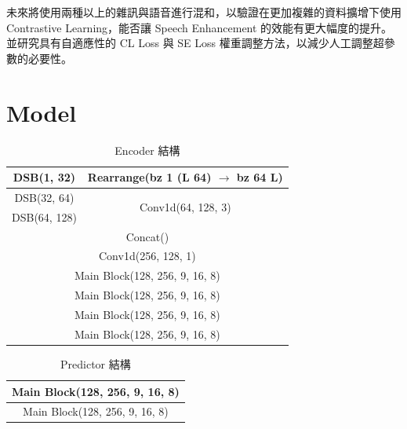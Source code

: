 \documentclass[10pt,twocolumn,letterpaper]{article}
\begin{document}
\begin{CJK}{UTF8}{bkai}
   未來將使用兩種以上的雜訊與語音進行混和，以驗證在更加複雜的資料擴增下使用 Contrastive
   Learning，能否讓 Speech Enhancement 的效能有更大幅度的提升。並研究具有自適應性的
   CL Loss 與 SE Loss 權重調整方法，以減少人工調整超參數的必要性。

   {\small
   
   
   }
   \newpage

   \appendix
   \section{Model}
   \begin{table}
      \caption{Encoder 結構\label{table:Encoder}}
      \begin{center}
         \begin{tabular}{ c c }
            \hline
            DSB(1, 32)   & Rearrange(bz 1 (L 64) $\rightarrow$ bz 64 L) \\
            \hline
            DSB(32, 64)  & \multirow{2}{3cm}{Conv1d(64, 128, 3)}        \\
            \cline{1-1}
            DSB(64, 128) &                                              \\
            \hline
            \multicolumn{2}{c}{Concat()}                                \\
            \hline
            \multicolumn{2}{c}{Conv1d(256, 128, 1)}                     \\
            \hline
            \multicolumn{2}{c}{Main Block(128, 256, 9, 16, 8)}          \\
            \hline
            \multicolumn{2}{c}{Main Block(128, 256, 9, 16, 8)}          \\
            \hline
            \multicolumn{2}{c}{Main Block(128, 256, 9, 16, 8)}          \\
            \hline
            \multicolumn{2}{c}{Main Block(128, 256, 9, 16, 8)}          \\
            \hline
         \end{tabular}
      \end{center}
   \end{table}

   \begin{table}
      \caption{Predictor 結構\label{table:Predictor}}
      \begin{center}
         \begin{tabular}{ c c }
            \hline
            \multicolumn{2}{c}{Main Block(128, 256, 9, 16, 8)} \\
            \hline
            \multicolumn{2}{c}{Main Block(128, 256, 9, 16, 8)} \\
            \hline
         \end{tabular}
      \end{center}
   \end{table}


\end{CJK}
\end{document}
